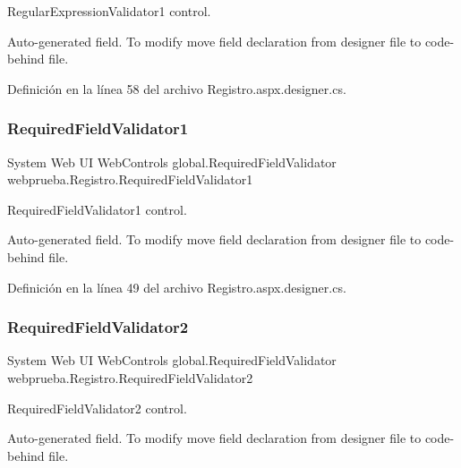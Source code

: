 Regular\+Expression\+Validator1 control. 

Auto-\/generated field. To modify move field declaration from designer file to code-\/behind file. 

Definición en la línea 58 del archivo Registro.\+aspx.\+designer.\+cs.

\mbox{\label{classwebprueba_1_1_registro_ad4a1548fbabb392bac62239ac93a2711}} 
\subsubsection{\texorpdfstring{RequiredFieldValidator1}{RequiredFieldValidator1}}
{\footnotesize\ttfamily System Web UI Web\+Controls global.\+Required\+Field\+Validator webprueba.\+Registro.\+Required\+Field\+Validator1\hspace{0.3cm}{\ttfamily [protected]}}



Required\+Field\+Validator1 control. 

Auto-\/generated field. To modify move field declaration from designer file to code-\/behind file. 

Definición en la línea 49 del archivo Registro.\+aspx.\+designer.\+cs.

\mbox{\label{classwebprueba_1_1_registro_a68652f63882210b3b2c31892e07e6148}} 
\subsubsection{\texorpdfstring{RequiredFieldValidator2}{RequiredFieldValidator2}}
{\footnotesize\ttfamily System Web UI Web\+Controls global.\+Required\+Field\+Validator webprueba.\+Registro.\+Required\+Field\+Validator2\hspace{0.3cm}{\ttfamily [protected]}}



Required\+Field\+Validator2 control. 

Auto-\/generated field. To modify move field declaration from designer file to code-\/behind file. 

